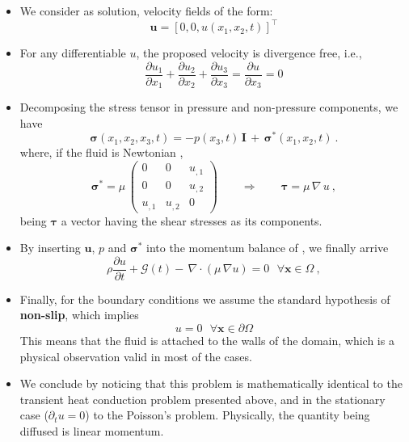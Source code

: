 \begin{kaobox}
\begin{itemize}
\item We consider as solution, velocity fields of the form:
\begin{equation}
\mathbf{u} = [0, 0, u(x_1,x_2,t)]^{\intercal}
\end{equation}

\item For any differentiable $u$, the proposed velocity is divergence free, i.e.,
\begin{equation}
\frac{\partial{u_1}}{\partial{x_1}} + \frac{\partial{u_2}}{\partial{x_2}} + \frac{\partial{u_3}}{\partial{x_3}}
=  \frac{\partial{u}}{\partial{x_3}} = 0
\end{equation}

\item Decomposing the stress tensor in pressure and non-pressure
components, we have
\begin{equation}
\boldsymbol{\sigma}(x_1,x_2,x_3,t)=-p(x_3,t)\,\mathbf{I}\,+\,\boldsymbol{\sigma}^*(x_1,x_2,t)~.
\label{eqstress3}
\end{equation}
where, if the fluid is Newtonian , 
\begin{equation}
\boldsymbol{\sigma}^*=\mu\,\left (
\begin{array}{ccc}
0 & 0 & u_{,1} \\ 0 & 0 & u_{,2} \\ u_{,1} & u_{,2} & 0
\end{array} \right )
\qquad \Rightarrow \qquad
\boldsymbol{\tau} = \mu\,\nabla\,u~,
\end{equation}
being $\boldsymbol{\tau}$ a vector having the shear stresses as its components.\\

\item By inserting $\mathbf{u}$, $p$ and $\boldsymbol{\sigma}^*$
into the momentum balance of , we finally arrive
\begin{equation}
\rho\dfrac{\partial{u}}{\partial{t}} + \mathcal{G}(t) - \,\nabla\cdot(\mu\,\nabla u)=0~~~\forall \mathbf{x} \in\Omega~,
\label{diffeq3}
\end{equation}

\item Finally, for the boundary conditions we assume the standard hypothesis of
\textbf{non-slip}, which implies
\begin{equation}
u = 0~~~\forall \mathbf{x} \in \partial{\Omega}
\end{equation}
This means that the fluid is attached to the walls of the domain, which is a physical
observation valid in most of the cases.\\
\item We conclude by noticing that this problem is mathematically identical
to the transient heat conduction problem presented above, and in the
stationary case ($\partial_t{u} = 0$) to the
Poisson's problem. Physically, the quantity being diffused is linear momentum.


\end{itemize}
\end{kaobox}
